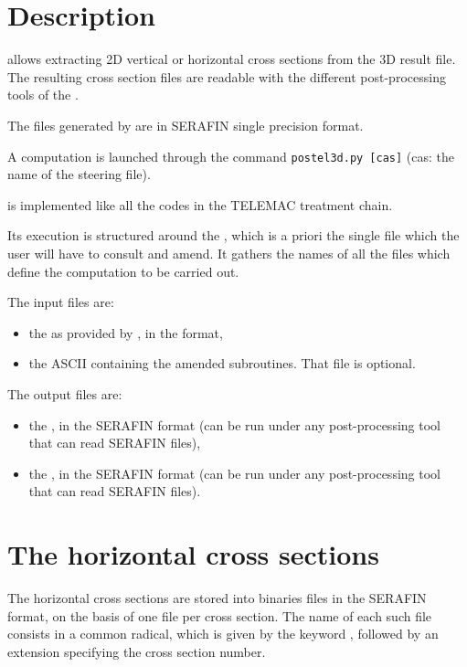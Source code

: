 \chapter{Description}

\postel allows extracting 2D vertical or horizontal cross sections
from the 3D result file. The resulting cross section files are readable with
the different post-processing tools of the \telemacsystem.

The files generated by \postel are in SERAFIN single precision format.

A computation is launched through the command \verb!postel3d.py [cas]! (cas:
the name of the steering file).

\postel is implemented like all the codes in the TELEMAC treatment chain.

Its execution is structured around the , which is a
priori the single file which the user will have to consult and amend. It
gathers the names of all the files which define the computation to be carried
out.

The input files are:

\begin{itemize}
\item the  as provided by , in the 
format,

\item the ASCII  containing the amended subroutines. That
file is optional.
\end{itemize}

The output files are:

\begin{itemize}
\item the , in the SERAFIN format (can
be run under any post-processing tool that can read SERAFIN files),

\item the , in the SERAFIN format (can be
run under any post-processing tool that can read SERAFIN files).
\end{itemize}


\chapter{The horizontal cross sections}

The horizontal cross sections are stored into binaries files in the SERAFIN
format, on the basis of one file per cross section. The name of each such file
consists in a common radical, which is given by the keyword , followed by an extension specifying the cross section
number.

